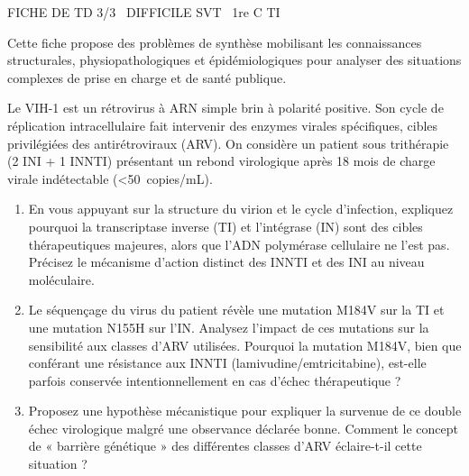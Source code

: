 \documentclass[11pt]{article}
\begin{document}
\begin{tcolorbox}[enhanced,colback=popink,colframe=popink,arc=10pt,boxrule=0pt,left=12pt,right=12pt,top=9pt,bottom=9pt]
{\color{white}\popxbold\small FICHE DE TD 3/3 \textbullet\ DIFFICILE \hfill SVT \textbullet\ 1re C TI\par}
\end{tcolorbox}
\vspace{4pt}
Cette fiche propose des problèmes de synthèse mobilisant les connaissances structurales, physiopathologiques et épidémiologiques pour analyser des situations complexes de prise en charge et de santé publique.

\begin{exercice}
Le VIH-1 est un rétrovirus à ARN simple brin à polarité positive. Son cycle de réplication intracellulaire fait intervenir des enzymes virales spécifiques, cibles privilégiées des antirétroviraux (ARV). On considère un patient sous trithérapie (2 INI + 1 INNTI) présentant un rebond virologique après 18 mois de charge virale indétectable (\textless \SI{50}{copies/mL}).

\begin{enumerate}
    \item En vous appuyant sur la structure du virion et le cycle d'infection, expliquez pourquoi la transcriptase inverse (TI) et l'intégrase (IN) sont des cibles thérapeutiques majeures, alors que l'ADN polymérase cellulaire ne l'est pas. Précisez le mécanisme d'action distinct des INNTI et des INI au niveau moléculaire.
    \item Le séquençage du virus du patient révèle une mutation M184V sur la TI et une mutation N155H sur l'IN. Analysez l'impact de ces mutations sur la sensibilité aux classes d'ARV utilisées. Pourquoi la mutation M184V, bien que conférant une résistance aux INNTI (lamivudine/emtricitabine), est-elle parfois conservée intentionnellement en cas d'échec thérapeutique ?
    \item Proposez une hypothèse mécanistique pour expliquer la survenue de ce double échec virologique malgré une observance déclarée bonne. Comment le concept de « barrière génétique » des différentes classes d'ARV éclaire-t-il cette situation ?
\end{enumerate}
\end{exercice}
\end{document}
